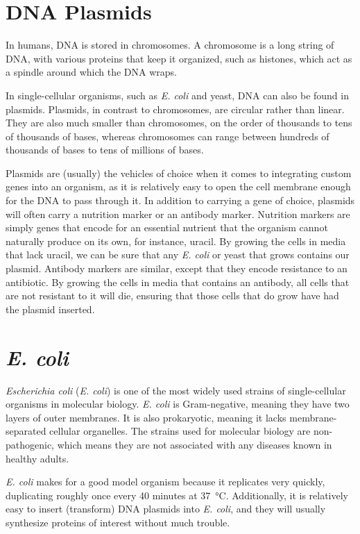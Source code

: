 \section{DNA Plasmids}

In humans, DNA is stored in chromosomes. A chromosome is a long string of DNA, with various proteins that keep it organized, such as histones, which act as a spindle around which the DNA wraps.

In single-cellular organisms, such as \textit{E. coli} and yeast, DNA can also be found in plasmids. Plasmids, in contrast to chromosomes, are circular rather than linear. They are also much smaller than chromosomes, on the order of thousands to tens of thousands of bases, whereas chromosomes can range between hundreds of thousands of bases to tens of millions of bases.

Plasmids are (usually) the vehicles of choice when it comes to integrating custom genes into an organism, as it is relatively easy to open the cell membrane enough for the DNA to pass through it. In addition to carrying a gene of choice, plasmids will often carry a nutrition marker or an antibody marker. Nutrition markers are simply genes that encode for an essential nutrient that the organism cannot naturally produce on its own, for instance, uracil. By growing the cells in media that lack uracil, we can be sure that any \textit{E. coli} or yeast that grows contains our plasmid. Antibody markers are similar, except that they encode resistance to an antibiotic. By growing the cells in media that contains an antibody, all cells that are not resistant to it will die, ensuring that those cells that do grow have had the plasmid inserted.

\section{\textit{E. coli}}

\textit{Escherichia coli} (\textit{E. coli}) is one of the most widely used strains of single-cellular organisms in molecular biology. \textit{E. coli} is Gram-negative, meaning they have two layers of outer membranes. It is also prokaryotic, meaning it lacks membrane-separated cellular organelles. The strains used for molecular biology are non-pathogenic, which means they are not associated with any diseases known in healthy adults.

\textit{E. coli} makes for a good model organism because it replicates very quickly, duplicating roughly once every \num{40} minutes at \qty{37}{\degreeCelsius}. Additionally, it is relatively easy to insert (transform) DNA plasmids into \textit{E. coli}, and they will usually synthesize proteins of interest without much trouble.

